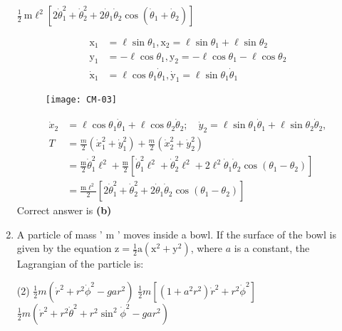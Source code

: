 \begin{enumerate}
\begin{tasks}
		\task[\textbf{d.}] $\frac{1}{2} \mathrm{~m} \ell^{2}\left[2 \dot{\theta}_{1}^{2}+\dot{\theta}_{2}^{2}+2 \dot{\theta}_{1} \dot{\theta}_{2} \cos \left(\dot{\theta}_{1}+\dot{\theta}_{2}\right)\right]$
	\end{tasks}
	\begin{answer}
		\begin{align*}
	\mathrm{x}_{1}&=\ell \sin \theta_{1},  \mathrm{x}_{2}=\ell \sin \theta_{1}+\ell \sin \theta_{2} \\ \mathrm{y}_{1}&=-\ell \cos \theta_{1},  \mathrm{y}_{2}=-\ell \cos \theta_{1}-\ell \cos \theta_{2} \\ \dot{\mathrm{x}}_{1}&=\ell \cos \theta_{1} \dot{\theta}_{1},  \dot{\mathrm{y}}_{1}=\ell \sin \theta_{1} \dot{\theta}_{1}
		\end{align*}
		\begin{figure}[H]
			\centering
			\texttt{[image: CM-03]}
		\end{figure}
		\begin{align*}
		\dot{x}_{2}&=\ell \cos \theta_{1} \dot{\theta}_{1}+\ell \cos \theta_{2} \dot{\theta}_{2} ; \quad \dot{y}_{2}=\ell \sin \theta_{1} \dot{\theta}_{1}+\ell \sin \theta_{2} \dot{\theta}_{2},\\
		T&=\frac{m}{2}\left(\dot{x}_{1}^{2}+\dot{y}_{1}^{2}\right)+\frac{m}{2}\left(\dot{x}_{2}^{2}+\dot{y}_{2}^{2}\right)\\
		&=\frac{\mathrm{m}}{2} \dot{\theta}_{1}^{2} \ell^{2}+\frac{\mathrm{m}}{2}\left[\dot{\theta}_{1}^{2} \ell^{2}+\dot{\theta}_{2}^{2} \ell^{2}+2 \ell^{2} \dot{\theta}_{1} \dot{\theta}_{2} \cos \left(\theta_{1}-\theta_{2}\right)\right]\\
		&=\frac{\mathrm{m} \ell^{2}}{2}\left[2 \dot{\theta}_{1}^{2}+\dot{\theta}_{2}^{2}+2 \dot{\theta}_{1} \dot{\theta}_{2} \cos \left(\theta_{1}-\theta_{2}\right)\right]
		\end{align*}
		Correct answer is \textbf{(b)}
	\end{answer}
	\item A particle of mass ' $\mathrm{m}$ ' moves inside a bowl. If the surface of the bowl is given by the equation $\mathrm{z}=\frac{1}{2} \mathrm{a}\left(\mathrm{x}^{2}+\mathrm{y}^{2}\right)$, where $a$ is a constant, the Lagrangian of the particle is:
	 \begin{tasks}(2)
		\task[\textbf{a.}] $\frac{1}{2} m\left(\dot{r}^{2}+r^{2} \dot{\phi}^{2}-g a r^{2}\right)$
		\task[\textbf{b.}] $\frac{1}{2} m\left[\left(1+a^{2} r^{2}\right) \dot{r}^{2}+r^{2} \dot{\phi}^{2}\right]$
		\task[\textbf{c.}]$\frac{1}{2} m\left(\dot{r}^{2}+r^{2} \dot{\theta}^{2}+r^{2} \sin ^{2} \dot{\phi}^{2}-g a r^{2}\right)$

\end{tasks}
\end{enumerate}

